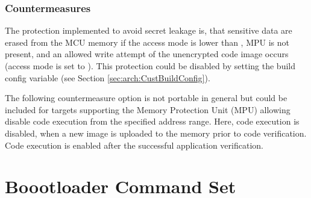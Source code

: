 
\subsubsection*{Countermeasures}

The protection implemented to avoid secret leakage is, that sensitive data are erased from the MCU memory if the access mode is lower than  , MPU is not present, and an allowed write attempt of the unencrypted code image occurs (access mode is set to ). This protection could be disabled by setting the build config variable  (see Section \ref{sec:arch:CustBuildConfig}).

The following countermeasure option is not portable in general but could be included for targets supporting the Memory Protection Unit (MPU)
allowing disable code execution from the specified address range.
Here, code execution is disabled, when a new image is uploaded to the memory prior to code verification.
Code execution is enabled after the successful application verification.



\clearpage
\section{Boootloader Command Set}

